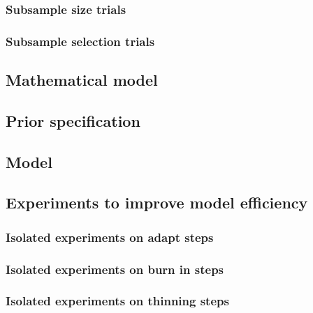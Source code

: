 \documentclass[12pt]{article}
\begin{document}
\hypertarget{subsample-size-trials}{%
\subsubsection{Subsample size trials}\label{subsample-size-trials}}

\hypertarget{subsample-selection-trials}{%
\subsubsection{Subsample selection
trials}\label{subsample-selection-trials}}

\hypertarget{mathematical-model}{%
\subsection{Mathematical model}\label{mathematical-model}}

\hypertarget{prior-specification}{%
\subsection{Prior specification}\label{prior-specification}}

\hypertarget{model}{%
\subsection{Model}\label{model}}

\hypertarget{experiments-to-improve-model-efficiency}{%
\subsection{Experiments to improve model
efficiency}\label{experiments-to-improve-model-efficiency}}

\hypertarget{isolated-experiments-on-adapt-steps}{%
\subsubsection{Isolated experiments on adapt
steps}\label{isolated-experiments-on-adapt-steps}}

\hypertarget{isolated-experiments-on-burn-in-steps}{%
\subsubsection{Isolated experiments on burn in
steps}\label{isolated-experiments-on-burn-in-steps}}

\hypertarget{isolated-experiments-on-thinning-steps}{%
\subsubsection{Isolated experiments on thinning
steps}\label{isolated-experiments-on-thinning-steps}}
\end{document}
